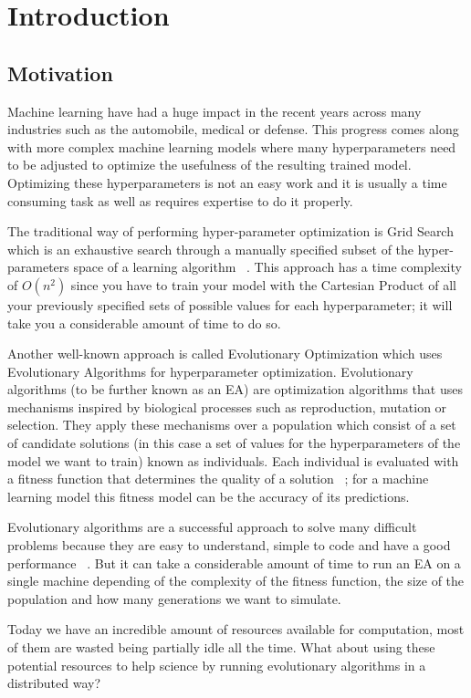 \chapter{Introduction}
\section{Motivation}
Machine learning have had a huge impact in the recent years across many industries such as the automobile, medical or defense. This progress comes along with more complex machine learning models where many hyperparameters need to be adjusted to optimize the usefulness of the resulting trained model. Optimizing these hyperparameters is not an easy work and it is usually a time consuming task as well as requires expertise to do it properly.

The traditional way of performing hyper-parameter optimization is Grid Search which is an exhaustive search through a manually specified subset of the hyper-parameters space of a learning algorithm ~\cite{wikipedia-Hyperparameter_optimization}. This approach has a time complexity of $O(n^{2})$ since you have to train your model with the Cartesian Product of all your previously specified sets of possible values for each hyperparameter; it will take you a considerable amount of time to do so.

Another well-known approach is called Evolutionary Optimization which uses Evolutionary Algorithms for hyperparameter optimization. Evolutionary algorithms (to be further known as an EA) are optimization algorithms that uses mechanisms inspired by biological processes such as reproduction, mutation or selection. They apply these mechanisms over a population which consist of a set of candidate solutions (in this case a set of values for the hyperparameters of the model we want to train) known as individuals. Each individual is evaluated with a fitness function that determines the quality of a solution ~\cite{wikipedia-Evolutionary_Algorithm}; for a machine learning model this fitness model can be the accuracy of its predictions.

Evolutionary algorithms are a successful approach to solve many difficult problems because they are easy to understand, simple to code and have a good performance ~\cite{Intro-to-EA}. But it can take a considerable amount of time to run an EA on a single machine depending of the complexity of the fitness function, the size of the population and how many generations we want to simulate.

Today we have an incredible amount of resources available for computation, most of them are wasted being partially idle all the time. What about using these potential resources to help science by running evolutionary algorithms in a distributed way?


